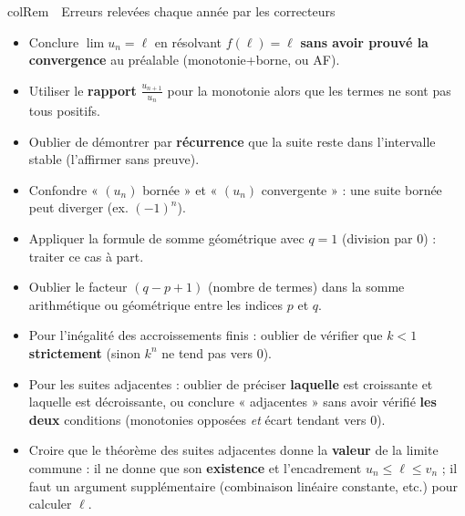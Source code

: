 \documentclass[11pt,a4paper]{article}
\newenvironment{remarque}[1][Remarque]
  {\begin{fiche}{colRem}{\ding{43}~~#1}}{\end{fiche}}
\begin{document}
\begin{remarque}[Erreurs relevées chaque année par les correcteurs]
\begin{itemize}[leftmargin=6mm, itemsep=0.5mm]
  \item Conclure $\lim u_n = \ell$ en résolvant $f(\ell)=\ell$ \textbf{sans avoir prouvé la convergence} au préalable (monotonie+borne, ou AF).
  \item Utiliser le \textbf{rapport} $\frac{u_{n+1}}{u_n}$ pour la monotonie alors que les termes ne sont pas tous positifs.
  \item Oublier de démontrer par \textbf{récurrence} que la suite reste dans l'intervalle stable (l'affirmer sans preuve).
  \item Confondre « $(u_n)$ bornée » et « $(u_n)$ convergente » : une suite bornée peut diverger (ex. $(-1)^n$).
  \item Appliquer la formule de somme géométrique avec $q=1$ (division par $0$) : traiter ce cas à part.
  \item Oublier le facteur $(q-p+1)$ (nombre de termes) dans la somme arithmétique ou géométrique entre les indices $p$ et $q$.
  \item Pour l'inégalité des accroissements finis : oublier de vérifier que $k<1$ \textbf{strictement} (sinon $k^n$ ne tend pas vers $0$).
  \item Pour les suites adjacentes : oublier de préciser \textbf{laquelle} est croissante et laquelle est décroissante, ou conclure « adjacentes » sans avoir vérifié \textbf{les deux} conditions (monotonies opposées \emph{et} écart tendant vers $0$).
  \item Croire que le théorème des suites adjacentes donne la \textbf{valeur} de la limite commune : il ne donne que son \textbf{existence} et l'encadrement $u_n\leq\ell\leq v_n$ ; il faut un argument supplémentaire (combinaison linéaire constante, etc.) pour calculer $\ell$.
\end{itemize}
\end{remarque}
\end{document}
